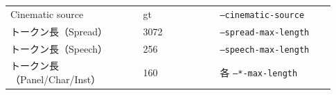 \documentclass[a4j,12pt,dvipdfmx]{jsreport}
\begin{document}
\begin{table}[htbp]
\begin{threeparttable}
\begin{tabular}{p{0.38\linewidth} p{0.22\linewidth} p{0.33\linewidth}}
      Cinematic source            & gt               & \texttt{--cinematic-source}            \\
      トークン長（Spread）               & 3072             & \texttt{--spread-max-length}           \\
      トークン長（Speech）               & 256              & \texttt{--speech-max-length}           \\
      トークン長（Panel/Char/Inst）      & 160              & 各 \texttt{--*-max-length}              \\
      \bottomrule
    \end{tabular}
  \end{threeparttable}
\end{table}
\ifdefined\ismain\else
  \printbibliography[title=参考文献]
\fi
\end{document}
